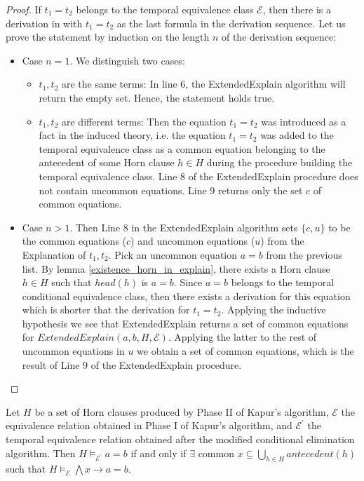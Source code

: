 \begin{proof} 
  If $t_1 = t_2$ belongs to the temporal equivalence
  class $\mathcal{E}$, then there is a derivation 
  in with $t_1 = t_2$ as the last formula in the
  derivation sequence.
  Let us prove the statement by induction 
  on the length $n$ of the derivation sequence:
  
  \begin{itemize}
    \item Case $n = 1$. We distinguish two cases:
      \begin{itemize}
        \item $t_1, t_2$ are the same terms: In
          line 6, the ExtendedExplain algorithm will return 
          the empty set. Hence, the statement holds true.
        \item $t_1, t_2$ are different terms: Then the equation
          $t_1 = t_2$ was introduced as a fact in the
          induced theory, i.e. the equation $t_1 = t_2$
          was added to the temporal 
          equivalence class as a common equation belonging to 
          the antecedent of some Horn clause $h \in H$
          during the procedure building the temporal 
          equivalence class. Line 8 of the ExtendedExplain
          procedure does not contain uncommon equations.
          Line 9 returns only the set $c$ of 
          common equations.
      \end{itemize}
    \item Case $n > 1$. Then Line 8 in the
      ExtendedExplain algorithm sets $\{c, u\}$
      to be the 
      common equations ($c$) and uncommon equations ($u$)
      from the Explanation of $t_1, t_2$.
      Pick an uncommon equation $a = b$ from the 
      previous list. By lemma \ref{existence_horn_in_explain}, there
      exists a Horn clause $h \in H$ such that
      $head(h)$ is $a = b$. Since $a = b$ belongs
      to the temporal conditional equivalence 
      class, then there exists a derivation for 
      this equation which is shorter that
      the derivation for $t_1 = t_2$. Applying
      the inductive hypothesis we see that
      ExtendedExplain returns a set of common equations
      for $ExtendedExplain(a, b, H, \mathcal{E})$.
      Applying the latter to the rest of uncommon equations
      in $u$ we obtain a set of common equations, which is
      the result of Line 9 of the ExtendedExplain procedure. 
  \end{itemize}
\end{proof}

\begin{corollary} \label{commonantecedentcorollary}
  Let $H$ be a set of Horn clauses produced by 
  Phase II of Kapur's algorithm, $\mathcal{E}$ the 
  equivalence relation obtained in Phase I of Kapur's 
  algorithm, and $\mathcal{E^{'}}$ the temporal 
  equivalence relation obtained after the modified
  conditional elimination algorithm. Then
  $H \models_{\mathcal{E^{'}}} a = b$ if and only if
  $\exists \text{ common } x \subseteq 
  \bigcup_{h \in H} antecedent(h)$ such that
  $H \models_{\mathcal{E}} \bigwedge x \rightarrow a = b$.
\end{corollary}

